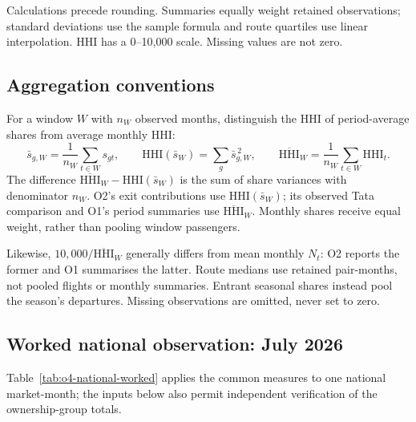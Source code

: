 Calculations precede rounding. Summaries equally weight retained observations; standard deviations use the sample formula and route quartiles use linear interpolation. HHI has a 0--10,000 scale. Missing values are not zero.

\subsection{Aggregation conventions}
For a window $W$ with $n_W$ observed months, distinguish the HHI of period-average shares from average monthly HHI:
\[
\bar s_{g,W}=\frac{1}{n_W}\sum_{t\in W}s_{gt},\qquad
\mathrm{HHI}(\bar s_W)=\sum_g\bar s_{g,W}^{\,2},\qquad
\overline{\mathrm{HHI}}_W=\frac{1}{n_W}\sum_{t\in W}\mathrm{HHI}_t.
\]
The difference $\overline{\mathrm{HHI}}_W-\mathrm{HHI}(\bar s_W)$ is the sum of share variances with denominator $n_W$. O2's exit contributions use $\mathrm{HHI}(\bar s_W)$; its observed Tata comparison and O1's period summaries use $\overline{\mathrm{HHI}}_W$. Monthly shares receive equal weight, rather than pooling window passengers.

Likewise, $10{,}000/\overline{\mathrm{HHI}}_W$ generally differs from mean monthly $N_t$: O2 reports the former and O1 summarises the latter. Route medians use retained pair-months, not pooled flights or monthly summaries. Entrant seasonal shares instead pool the season's departures. Missing observations are omitted, never set to zero.

\subsection{Worked national observation: July 2026}
\label{app:o4-national-calculations}
Table~\ref{tab:o4-national-worked} applies the common measures to one national market-month; the inputs below also permit independent verification of the ownership-group totals.

